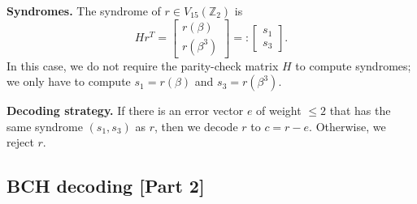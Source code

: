 \documentclass[10pt]{article}
\newcommand{\Z}{\mathbb{Z}}
\theoremstyle{newstyle}
\begin{document}
{\bf Syndromes.} The syndrome of $r \in V_{15}(\Z_2)$ is 
\[ Hr^T = \begin{bmatrix} r(\beta) \\ r(\beta^3) \end{bmatrix} =: \begin{bmatrix} s_1 \\ s_3 \end{bmatrix}. \]
In this case, we do not require the parity-check matrix $H$ to compute syndromes;
we only have to compute 
$s_1 = r(\beta)$ and $s_3 = r(\beta^3)$. 

{\bf Decoding strategy.} If there is an error vector $e$ of weight $\leq 2$ that has the 
same syndrome $(s_1, s_3)$ as $r$, then we decode $r$ to $c = r-e$. Otherwise, we reject $r$. 

\subsection{BCH decoding [Part 2]}
\end{document}

